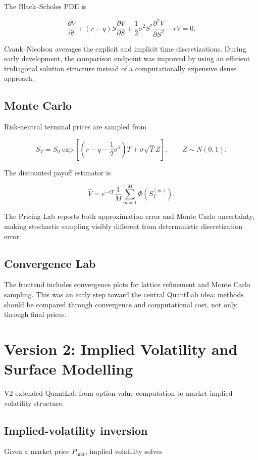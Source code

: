 \documentclass[11pt,a4paper]{article}
\begin{document}
The Black--Scholes PDE is

\[
\frac{\partial V}{\partial t}
+(r-q)S\frac{\partial V}{\partial S}
+\frac12\sigma^2S^2\frac{\partial^2V}{\partial S^2}
-rV=0.
\]

Crank--Nicolson averages the explicit and implicit time discretizations. During early development, the comparison endpoint was improved by using an efficient tridiagonal solution structure instead of a computationally expensive dense approach.

\subsection{Monte Carlo}

Risk-neutral terminal prices are sampled from

\[
S_T=S_0\exp\left[
\left(r-q-\frac12\sigma^2\right)T+
\sigma\sqrt{T}Z
\right],
\qquad Z\sim N(0,1).
\]

The discounted payoff estimator is

\[
\hat V=e^{-rT}\frac{1}{M}\sum_{m=1}^{M}\Phi(S_T^{(m)}).
\]

The Pricing Lab reports both approximation error and Monte Carlo uncertainty, making stochastic sampling visibly different from deterministic discretization error.

\subsection{Convergence Lab}

The frontend includes convergence plots for lattice refinement and Monte Carlo sampling. This was an early step toward the central QuantLab idea: methods should be compared through convergence and computational cost, not only through final prices.

\section{Version 2: Implied Volatility and Surface Modelling}

V2 extended QuantLab from option-value computation to market-implied volatility structure.

\subsection{Implied-volatility inversion}

Given a market price \(P_{\mathrm{mkt}}\), implied volatility solves
\end{document}
